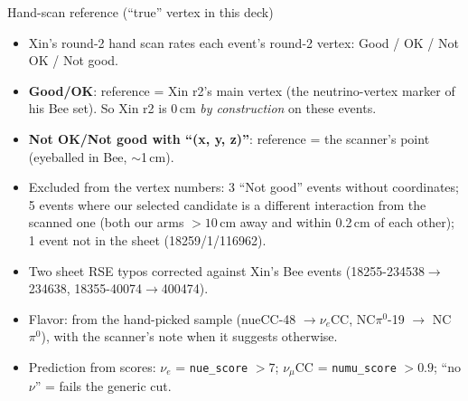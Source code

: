 \documentclass[aspectratio=169,10pt]{beamer}
\begin{document}
\begin{frame}{Hand-scan reference (``true'' vertex in this deck)}
\small
\begin{itemize}
\item Xin's round-2 hand scan rates each event's round-2 vertex: Good / OK / Not OK / Not good.
\item \textbf{Good/OK}: reference = Xin r2's main vertex (the neutrino-vertex marker of his Bee set).
So Xin r2 is 0\,cm \emph{by construction} on these events.
\item \textbf{Not OK/Not good with ``(x, y, z)''}: reference = the scanner's point (eyeballed in Bee, $\sim$1\,cm).
\item Excluded from the vertex numbers: 3 ``Not good'' events without coordinates; 5 events where our selected candidate is a different interaction from
the scanned one (both our arms $>10$\,cm away and within 0.2\,cm of each other); 1 event not in the sheet (18259/1/116962).
\item Two sheet RSE typos corrected against Xin's Bee events (18255-234538$\to$234638, 18355-40074$\to$400474).
\item Flavor: from the hand-picked sample (nueCC-48 $\to\nu_e$CC, NC$\pi^0$-19 $\to$ NC$\pi^0$), with the scanner's note when it suggests otherwise.
\item Prediction from scores: $\nu_e$ = \texttt{nue\_score} $>7$; $\nu_\mu$CC = \texttt{numu\_score} $>0.9$; ``no $\nu$'' = fails the generic cut.
\end{itemize}
\end{frame}
\end{document}
